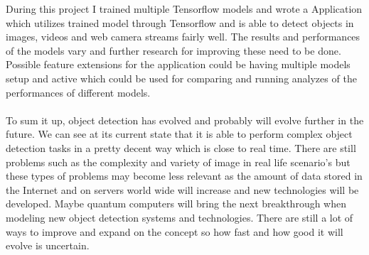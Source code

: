 
During this project I trained multiple Tensorflow models and wrote a Application which utilizes trained model through Tensorflow and is
able to detect objects in images, videos and web camera streams fairly well. The results and performances of the models vary and further
research for improving these need to be done. Possible feature extensions for the application could be having multiple models setup and
active which could be used for comparing and running analyzes of the performances of different models.\\\\
To sum it up, object detection has evolved and probably will evolve further in the future. We can see at its current state that it is able
to perform complex object detection tasks in a pretty decent way which is close to real time. There are still problems such as the
complexity and variety of image in real life scenario's but these types of problems may become less relevant as the amount
of data stored in the Internet and on servers world wide will increase and new technologies will be developed. Maybe quantum computers
will bring the next breakthrough when modeling new object detection systems and technologies. There are still a lot of ways to improve and
expand on the concept so how fast and how good it will evolve is uncertain.


